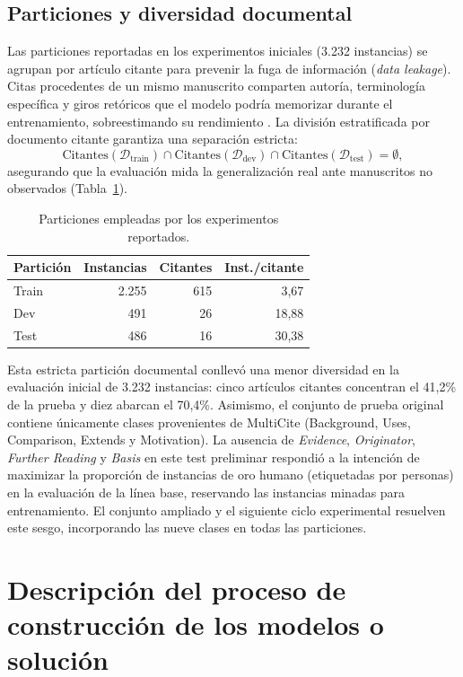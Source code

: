 \documentclass[10pt,a4paper,twocolumn]{article}
\begin{document}
\subsection{Particiones y diversidad documental}
Las particiones reportadas en los experimentos iniciales (3.232 instancias) se agrupan por artículo citante para prevenir la fuga de información (\textit{data leakage}). Citas procedentes de un mismo manuscrito comparten autoría, terminología específica y giros retóricos que el modelo podría memorizar durante el entrenamiento, sobreestimando su rendimiento \cite{Lauscher2022,Jurgens2018}. La división estratificada por documento citante garantiza una separación estricta:
\[
 \text{Citantes}(\mathcal{D}_{\text{train}}) \cap \text{Citantes}(\mathcal{D}_{\text{dev}}) \cap \text{Citantes}(\mathcal{D}_{\text{test}}) = \emptyset,
\]
asegurando que la evaluación mida la generalización real ante manuscritos no observados (Tabla~\ref{tab:splits}).

\begin{table}[t]
\centering\small
\caption{Particiones empleadas por los experimentos reportados.}\label{tab:splits}
\begin{tabular}{lrrr}\toprule
Partición & Instancias & Citantes & Inst./citante\\\midrule
Train & 2.255 & 615 & 3,67\\
Dev & 491 & 26 & 18,88\\
Test & 486 & 16 & 30,38\\\bottomrule
\end{tabular}
\end{table}

Esta estricta partición documental conllevó una menor diversidad en la evaluación inicial de 3.232 instancias: cinco artículos citantes concentran el 41,2\% de la prueba y diez abarcan el 70,4\%. Asimismo, el conjunto de prueba original contiene únicamente clases provenientes de MultiCite (Background, Uses, Comparison, Extends y Motivation). La ausencia de \textit{Evidence}, \textit{Originator}, \textit{Further Reading} y \textit{Basis} en este test preliminar respondió a la intención de maximizar la proporción de instancias de oro humano (etiquetadas por personas) en la evaluación de la línea base, reservando las instancias minadas para entrenamiento. El conjunto ampliado y el siguiente ciclo experimental resuelven este sesgo, incorporando las nueve clases en todas las particiones.

\section{Descripción del proceso de construcción de los modelos o solución}
\end{document}
